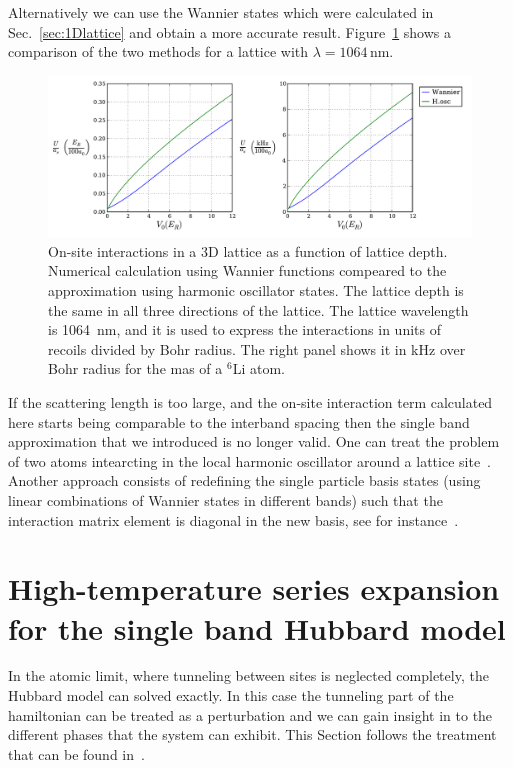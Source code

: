 \documentclass[11pt,letter]{article}
\begin{document}
Alternatively we can use the Wannier states which were calculated in
Sec.~\ref{sec:1Dlattice} and obtain a more accurate result.
Figure~\ref{fig:wfactor} shows a comparison of the two methods for a lattice
with $\lambda=1064$\,nm. 
\begin{figure}
\centering \includegraphics[width=\textwidth]{../BandStructure_figures/wFactor_V0_a0.pdf}
\caption[On-site interactions in a 3D lattice]{\small On-site interactions in a
3D lattice as a function of lattice depth.  Numerical calculation using Wannier
functions compeared to the approximation using harmonic oscillator states.  The
lattice depth is the same in all three directions of the lattice.   The lattice
wavelength is 1064~nm, and it is used to express the interactions in units of
recoils divided by Bohr radius.  The right panel shows it in kHz over Bohr
radius for the mas of a $^{6}$Li atom.} \label{fig:wfactor}
\end{figure}

If the scattering length is too large, and the on-site interaction term
calculated here starts being comparable to the interband spacing then the
single band approximation that we introduced is no longer valid.   One can
treat the problem of two atoms intearcting in the local harmonic oscillator
around a lattice site~\cite{Busch1998}.   Another approach consists of
redefining the single particle basis states (using linear combinations of
Wannier states in different bands) such that the interaction matrix element is
diagonal in the new basis, see for instance~\cite{Jordens2010,Mark2012}.
 

\section{ High-temperature series expansion for the single band Hubbard model }

In the atomic limit, where tunneling between sites is neglected completely, the
Hubbard model can solved exactly.  In this case the tunneling part of the
hamiltonian can be treated as a perturbation and we can gain insight in to the
different phases that the system can exhibit.  This Section follows the
treatment that can be found in~\cite{Henderson1992,Jordens2010}.   
\end{document}
